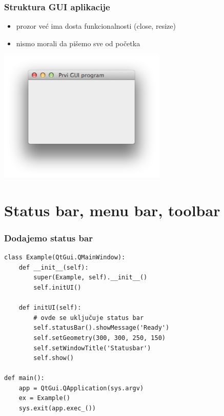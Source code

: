 \documentclass[utf8,compress]{beamer}
\begin{document}
\begin{frame}[fragile]
  \frametitle{Struktura GUI aplikacije}
  \begin{itemize}
    \item prozor već ima dosta funkcionalnosti (close, resize)
    \item nismo morali da pišemo sve od početka
  \end{itemize}
  \begin{center}
    \includegraphics[width=8cm]{pyqt01.png}
  \end{center}
\end{frame}

\section[Bars]{Status bar, menu bar, toolbar}

\begin{frame}[fragile]
  \frametitle{Dodajemo status bar}
\begin{verbatim}
class Example(QtGui.QMainWindow):
    def __init__(self):
        super(Example, self).__init__()
        self.initUI()
        
    def initUI(self):               
        # ovde se uključuje status bar
        self.statusBar().showMessage('Ready')
        self.setGeometry(300, 300, 250, 150)
        self.setWindowTitle('Statusbar')    
        self.show()

def main():    
    app = QtGui.QApplication(sys.argv)
    ex = Example()
    sys.exit(app.exec_())
\end{verbatim}
\end{frame}
\end{document}

